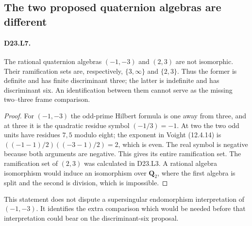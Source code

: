 \subsection{The two proposed quaternion algebras are different}
\paragraph{D23.L7.}
The rational quaternion algebras $(-1,-3)$ and $(2,3)$ are
not isomorphic.  Their ramification sets are, respectively,
$\{3,\infty\}$ and $\{2,3\}$.  Thus the former is definite
and has finite discriminant three; the latter is indefinite
and has discriminant six.  An identification between them cannot
serve as the missing two--three frame comparison.
\begin{proof}
For $(-1,-3)$ the odd-prime Hilbert formula is one away from
three, and at three it is the quadratic residue symbol
$(-1/3)=-1$.  At two the two odd units have residues $7,5$
modulo eight; the exponent in Voight (12.4.14) is
$(({-1}-1)/2)(({-3}-1)/2)=2$, which is even.
The real symbol is negative because both arguments are negative.
This gives its entire ramification set.  The ramification set
of $(2,3)$ was calculated in D23.L3.  A rational algebra
isomorphism would induce an isomorphism over $\mathbf Q_2$,
where the first algebra is split and the second is division,
which is impossible.
\end{proof}
This statement does not dispute a supersingular endomorphism
interpretation of $(-1,-3)$.  It identifies the extra comparison
which would be needed before that interpretation could bear on
the discriminant-six proposal.
